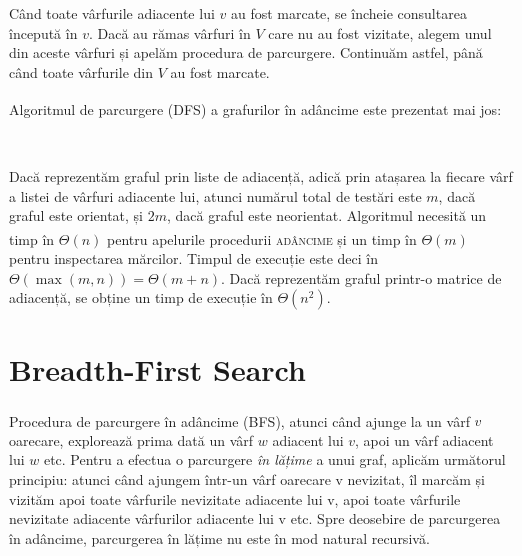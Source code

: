 \documentclass[9pt,a4paper]{report}
\begin{document}
Când toate vârfurile adiacente lui $v$ au fost marcate, se încheie consultarea începută în $v$. Dacă au rămas vârfuri în $V$ care nu au fost vizitate, alegem unul din aceste vârfuri și apelăm procedura de parcurgere. Continuăm astfel, până când toate vârfurile din $V$ au fost marcate. 

Algoritmul de parcurgere (DFS)\textsuperscript{\cite{andonie}} a grafurilor în adâncime este prezentat mai jos:

\pagebreak

\begin{algorithm}
    \begin{algorithmic}
            \EndFor
                \EndIf
            \EndFor
        \EndProcedure
        \\
                \EndIf
            \EndFor
        \EndProcedure
    \end{algorithmic}
\end{algorithm}

Dacă reprezentăm graful prin liste de adiacență, adică prin atașarea la fiecare vârf a listei de vârfuri adiacente lui, atunci numărul total de testări este $m$, dacă graful este orientat, și $2m$, dacă graful este neorientat. Algoritmul necesită un timp\textsuperscript{\cite{andonie}} în $\Theta(n)$ pentru apelurile procedurii \textsc{adâncime} și un timp în $\Theta(m)$ pentru inspectarea mărcilor. Timpul de execuție este deci în $\Theta(\max(m,n)) = \Theta(m+n)$. Dacă reprezentăm graful printr-o matrice de adiacență, se obține un timp de execuție în $\Theta(n^2)$.

\section{Breadth-First Search}

Procedura de parcurgere în adâncime (BFS)\textsuperscript{\cite{andonie}}, atunci când ajunge la un vârf $v$ oarecare, explorează prima dată un vârf $w$ adiacent lui $v$, apoi un vârf adiacent lui $w$ etc. Pentru a efectua o parcurgere \textit{în lățime} a unui graf, aplicăm următorul principiu: atunci când ajungem într-un vârf oarecare v nevizitat, îl marcăm și vizităm apoi toate vârfurile nevizitate adiacente lui v, apoi toate vârfurile nevizitate adiacente vârfurilor adiacente lui v etc. Spre deosebire de parcurgerea în adâncime, parcurgerea în lățime nu este în mod natural recursivă.
\end{document}
